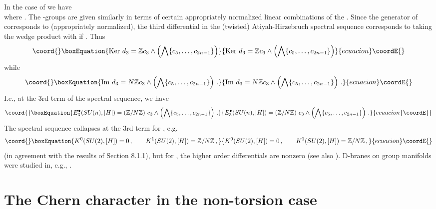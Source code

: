 \documentclass[a4paper,reqno]{amsart}
\theoremstyle{plain}
\theoremstyle{definition}
\theoremstyle{remark}
\numberwithin{equation}{section}
\numberwithin{figure}{section}
\providecommand{\ZZ}{{\mathbb Z}}
\providecommand{\QQ}{{\mathbb Q}}
\providecommand{\<}{\langle}
\renewcommand{\>}{\rangle}
\begin{document}
In the case of \coordHE{} we have \\
\myHighlight{$H^\bullet(G,\QQ) = \bigwedge \{ c_3,c_5,\ldots,c_{2n-1} \}$}\coordHE{}
where \myHighlight{$c_n\in H^n(G,\QQ)$}\coordHE{}.  The \coordHE{}-groups are given similarly in
terms of certain appropriately normalized linear combinations of the
\coordHE{}.  Since the generator of \myHighlight{$H^3(G,\ZZ)=\ZZ$}\coordHE{} corresponds to
\coordHE{}  (appropriately normalized), the third differential \coordHE{} in the
(twisted) Atiyah-Hirzebruch spectral sequence corresponds to taking the
wedge product with \coordHE{} if \coordHE{}.
Thus
\begin{equation}\coord{}\boxEquation{
{\rm Ker} \ d_3 = \ZZ c_3 \wedge \left( \bigwedge \{ c_5,\ldots,c_{2n-1} \}
       \right)
}{
{\rm Ker} \ d_3 = \ZZ c_3 \wedge \left( \bigwedge \{ c_5,\ldots,c_{2n-1} \}
       \right)
}{ecuacion}\coordE{}\end{equation}
while
\begin{equation}\coord{}\boxEquation{
{\rm Im} \ d_3 = N \ZZ c_3 \wedge \left( \bigwedge \{ c_5,\ldots,c_{2n-1} \}
       \right) \,.
}{
{\rm Im} \ d_3 = N \ZZ c_3 \wedge \left( \bigwedge \{ c_5,\ldots,c_{2n-1} \}
       \right) \,.
}{ecuacion}\coordE{}\end{equation}
I.e., at the 3rd term of the spectral sequence, we have
\begin{equation}\coord{}\boxEquation{
E_3^\bullet(SU(n),[H]) = (\ZZ/N\ZZ) \ c_3 \wedge \left(
\bigwedge \{ c_5,\ldots,c_{2n-1} \} \right) \,.
}{
E_3^\bullet(SU(n),[H]) = (\ZZ/N\ZZ) \ c_3 \wedge \left(
\bigwedge \{ c_5,\ldots,c_{2n-1} \} \right) \,.
}{ecuacion}\coordE{}\end{equation}
The spectral sequence collapses at the 3rd term for \coordHE{}, e.g.
\begin{equation}\coord{}\boxEquation{
K^0(SU(2),[H])  = 0\,, \qquad  K^1(SU(2),[H])  = \ZZ/N\ZZ\,, 
}{
K^0(SU(2),[H])  = 0\,, \qquad  K^1(SU(2),[H])  = \ZZ/N\ZZ\,, 
}{ecuacion}\coordE{}\end{equation}
(in agreement with the results of Section 8.1.1), but for 
\coordHE{}, the higher order differentials are nonzero
\cite{Hop} (see also \cite{MalMooSei}).
D-branes on group manifolds were studied in, e.g.,
\cite{AlSc,FigSta,FS}.


\section{The Chern character in the non-torsion case} 
\end{document}
